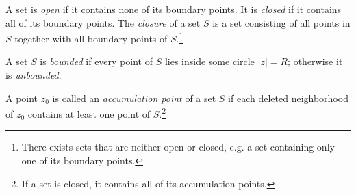 \documentclass[nobib,notoc]{tufte-handout}
\begin{document}
\begin{defi}
	A set is \emph{open} if it contains none of its boundary points. It is \emph{closed} if it contains all of its boundary points. The \emph{closure} of a set \(S\) is a set consisting of all points in \(S\) together with all boundary points of \(S\).\footnote{There exists sets that are neither open or closed, e.g. a set containing only one of its boundary points.}
\end{defi}
\begin{defi}
	A set \(S\) is \emph{bounded} if every point of \(S\) lies inside some circle \(\lvert z\rvert=R\); otherwise it is \emph{unbounded}.
\end{defi}
\begin{defi}
	A point \(z_0\) is called an \emph{accumulation point} of a set \(S\) if each deleted neighborhood of \(z_0\) contains at least one point of \(S\).\footnote{If a set is closed, it contains all of its accumulation points.}
\end{defi}
\end{document}
